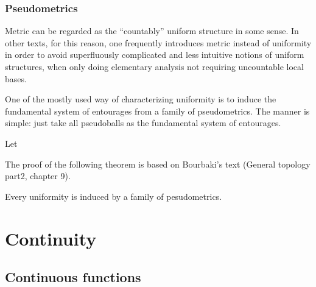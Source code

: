 \documentclass{../crs}
\begin{document}
\subsection{Pseudometrics}




Metric can be regarded as the ``countably'' uniform structure in some sense. 
In other texts, for this reason, one frequently introduces metric instead of uniformity in order to avoid superfluously complicated and less intuitive notions of uniform structures, when only doing elementary analysis not requiring uncountable local bases.



One of the mostly used way of characterizing uniformity is to induce the fundamental system of entourages from a family of pseudometrics.
The manner is simple: just take all pseudoballs as the fundamental system of entourages.
\begin{defn}
Let 
\end{defn}
The proof of the following theorem is based on Bourbaki's text (General topology part2, chapter 9).

\begin{thm}
Every uniformity is induced by a family of pesudometrics.
\end{thm}
\begin{pf}

\end{pf}


















\chapter{Continuity}


\section{Continuous functions}
\end{document}
